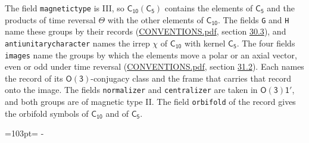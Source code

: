 \documentclass[10pt,a4paper]{article}
\newcommand{\needspace}[1]{\par\penalty-100\begingroup\dimen0=#1\relax\dimen2=\pagegoal
  \advance\dimen2-\pagetotal\ifdim\dimen0>\dimen2\relax\ifdim\dimen2>0pt\vfil\break\fi\fi
  \endgroup}
\numberwithin{equation}{section}
\newcommand{\grp}[1]{\mathsf{#1}}
\begin{document}
The field \texttt{magnetictype} is III, so $\grp{C_{10}}(\grp{C_{5}})$ contains the elements of $\grp{C_{5}}$ and the products of time reversal $\varTheta$ with the other elements of $\grp{C_{10}}$. The fields \texttt{G} and \texttt{H} name these groups by their records (\href{../../CONVENTIONS.pdf}{CONVENTIONS.pdf}, section \href{../../CONVENTIONS.pdf\#conv.30.3}{30.3}), and \texttt{antiunitarycharacter} names the irrep $\chi$ of $\grp{C_{10}}$ with kernel $\grp{C_{5}}$. The four fields \texttt{images} name the groups by which the elements move a polar or an axial vector, even or odd under time reversal (\href{../../CONVENTIONS.pdf}{CONVENTIONS.pdf}, section \href{../../CONVENTIONS.pdf\#conv.31.2}{31.2}). Each names the record of its $\grp{O(3)}$-conjugacy class and the frame that carries that record onto the image. The fields \texttt{normalizer} and \texttt{centralizer} are taken in $\grp{O(3)1'}$, and both groups are of magnetic type II. The field \texttt{orbifold} of the record gives the orbifold symbols of $\grp{C_{10}}$ and of $\grp{C_{5}}$.
\needspace{103pt}
\end{document}
